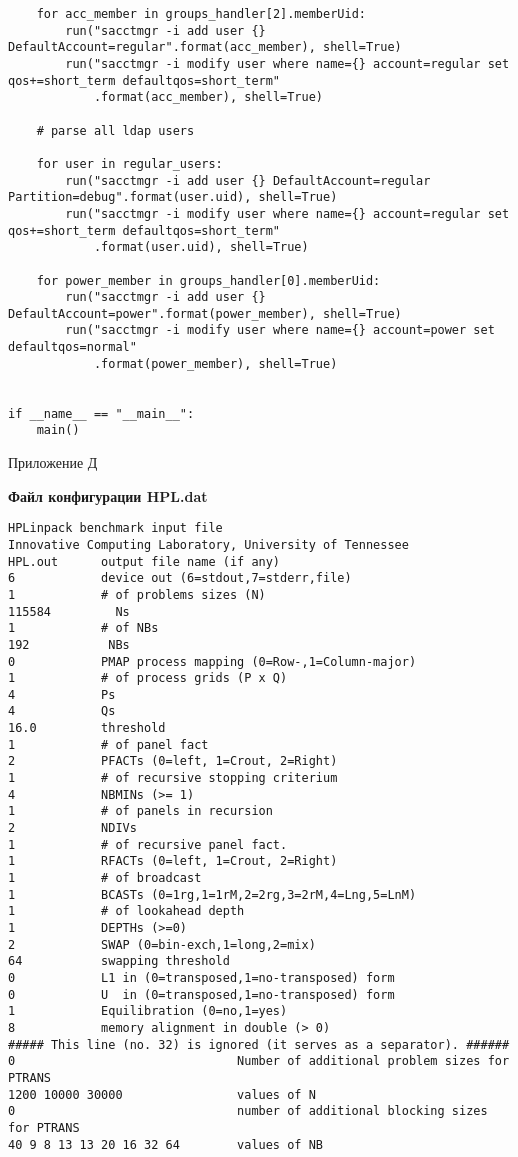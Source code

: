 \documentclass[a4paper]{extarticle}
\begin{document}
\begin{verbatim}
    for acc_member in groups_handler[2].memberUid:
        run("sacctmgr -i add user {} DefaultAccount=regular".format(acc_member), shell=True)
        run("sacctmgr -i modify user where name={} account=regular set qos+=short_term defaultqos=short_term"
            .format(acc_member), shell=True)

    # parse all ldap users

    for user in regular_users:
        run("sacctmgr -i add user {} DefaultAccount=regular Partition=debug".format(user.uid), shell=True)
        run("sacctmgr -i modify user where name={} account=regular set qos+=short_term defaultqos=short_term"
            .format(user.uid), shell=True)

    for power_member in groups_handler[0].memberUid:
        run("sacctmgr -i add user {} DefaultAccount=power".format(power_member), shell=True)
        run("sacctmgr -i modify user where name={} account=power set defaultqos=normal"
            .format(power_member), shell=True)


if __name__ == "__main__":
    main()
\end{verbatim}

\newpage

\begin{flushright}Приложение Д\end{flushright}
\centerline{\textbf{Файл конфигурации HPL.dat}}
\begin{verbatim}
HPLinpack benchmark input file
Innovative Computing Laboratory, University of Tennessee
HPL.out      output file name (if any) 
6            device out (6=stdout,7=stderr,file)
1            # of problems sizes (N)
115584         Ns
1            # of NBs
192           NBs
0            PMAP process mapping (0=Row-,1=Column-major)
1            # of process grids (P x Q)
4            Ps
4            Qs
16.0         threshold
1            # of panel fact
2            PFACTs (0=left, 1=Crout, 2=Right)
1            # of recursive stopping criterium
4            NBMINs (>= 1)
1            # of panels in recursion
2            NDIVs
1            # of recursive panel fact.
1            RFACTs (0=left, 1=Crout, 2=Right)
1            # of broadcast
1            BCASTs (0=1rg,1=1rM,2=2rg,3=2rM,4=Lng,5=LnM)
1            # of lookahead depth
1            DEPTHs (>=0)
2            SWAP (0=bin-exch,1=long,2=mix)
64           swapping threshold
0            L1 in (0=transposed,1=no-transposed) form
0            U  in (0=transposed,1=no-transposed) form
1            Equilibration (0=no,1=yes)
8            memory alignment in double (> 0)
##### This line (no. 32) is ignored (it serves as a separator). ######
0                               Number of additional problem sizes for PTRANS
1200 10000 30000                values of N
0                               number of additional blocking sizes for PTRANS
40 9 8 13 13 20 16 32 64        values of NB
\end{verbatim}
%
%
%
\end{document}
